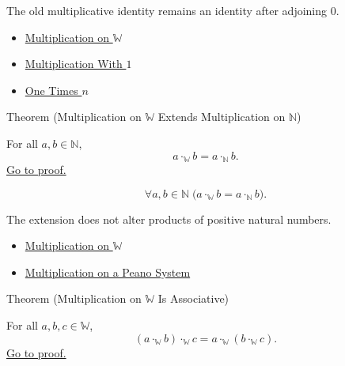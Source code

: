 \begin{remark*}[Interpretation]
The old multiplicative identity remains an identity after adjoining $0$.
\end{remark*}

\begin{dependencies}
\begin{itemize}
  \item \hyperref[def:multiplication-on-w]{Multiplication on $\mathbb{W}$}
  \item \hyperref[thm:multiplication-with-one]{Multiplication With $1$}
  \item \hyperref[thm:one-times-n]{One Times $n$}
\end{itemize}
\end{dependencies}

\begin{theorembox}{Theorem (Multiplication on \texorpdfstring{$\mathbb{W}$}{W} Extends Multiplication on \texorpdfstring{$\mathbb{N}$}{N})}
\begin{theorem}
\label{thm:multiplication-on-w-extends-multiplication-on-n}
For all $a,b\in\mathbb{N}$,
\[
a\cdot_{\mathbb{W}}b=a\cdot_{\mathbb{N}}b.
\]
\hyperref[prf:multiplication-on-w-extends-multiplication-on-n]{Go to proof.}
\end{theorem}
\end{theorembox}

\begin{remark*}
\[
\forall a,b\in\mathbb{N}\;
\bigl(a\cdot_{\mathbb{W}}b=a\cdot_{\mathbb{N}}b\bigr).
\]
\end{remark*}

\begin{remark*}[Interpretation]
The extension does not alter products of positive natural numbers.
\end{remark*}

\begin{dependencies}
\begin{itemize}
  \item \hyperref[def:multiplication-on-w]{Multiplication on $\mathbb{W}$}
  \item \hyperref[def:multiplication-on-peano-system]{Multiplication on a Peano System}
\end{itemize}
\end{dependencies}

\begin{theorembox}{Theorem (Multiplication on \texorpdfstring{$\mathbb{W}$}{W} Is Associative)}
\begin{theorem}
\label{thm:multiplication-on-w-associative}
For all $a,b,c\in\mathbb{W}$,
\[
(a\cdot_{\mathbb{W}}b)\cdot_{\mathbb{W}}c
=
a\cdot_{\mathbb{W}}(b\cdot_{\mathbb{W}}c).
\]
\hyperref[prf:multiplication-on-w-associative]{Go to proof.}
\end{theorem}
\end{theorembox}

